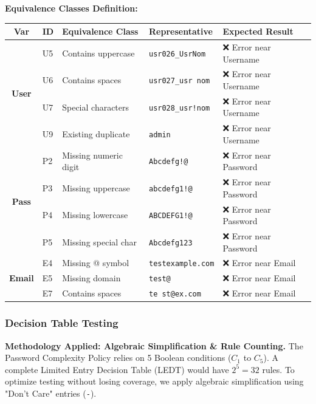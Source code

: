 \documentclass[twoside,final]{hcmut-report}
\begin{document}
\vspace{0.3cm}
\noindent\textbf{Equivalence Classes Definition:}
\begin{table}[H]
\centering
\renewcommand{\arraystretch}{1.2}
\begin{tabularx}{\textwidth}{|c|l|X|l|X|}
\hline
\textbf{Var} & \textbf{ID} & \textbf{Equivalence Class} & \textbf{Representative} & \textbf{Expected Result} \\ \hline
\multirow{4}{*}{\textbf{User}} 
& U5 & Contains uppercase & \texttt{usr026\_UsrNom} & ❌ Error near Username \\ \cline{2-5}
& U6 & Contains spaces & \texttt{usr027\_usr nom} & ❌ Error near Username \\ \cline{2-5}
& U7 & Special characters & \texttt{usr028\_usr!nom} & ❌ Error near Username \\ \cline{2-5}
& U9 & Existing duplicate & \texttt{admin} & ❌ Error near Username \\ \hline
\multirow{4}{*}{\textbf{Pass}} 
& P2 & Missing numeric digit & \texttt{Abcdefg!@} & ❌ Error near Password \\ \cline{2-5}
& P3 & Missing uppercase & \texttt{abcdefg1!@} & ❌ Error near Password \\ \cline{2-5}
& P4 & Missing lowercase & \texttt{ABCDEFG1!@} & ❌ Error near Password \\ \cline{2-5}
& P5 & Missing special char & \texttt{Abcdefg123} & ❌ Error near Password \\ \hline
\multirow{3}{*}{\textbf{Email}} 
& E4 & Missing @ symbol & \texttt{testexample.com} & ❌ Error near Email \\ \cline{2-5}
& E5 & Missing domain & \texttt{test@} & ❌ Error near Email \\ \cline{2-5}
& E7 & Contains spaces & \texttt{te st@ex.com} & ❌ Error near Email \\ \hline
\end{tabularx}
\end{table}

\subsubsection{Decision Table Testing}
\textbf{Methodology Applied: Algebraic Simplification \& Rule Counting.} 
The Password Complexity Policy relies on 5 Boolean conditions ($C_1$ to $C_5$). A complete Limited Entry Decision Table (LEDT) would have $2^5 = 32$ rules. To optimize testing without losing coverage, we apply algebraic simplification using "Don't Care" entries (\texttt{-}). 
\end{document}
